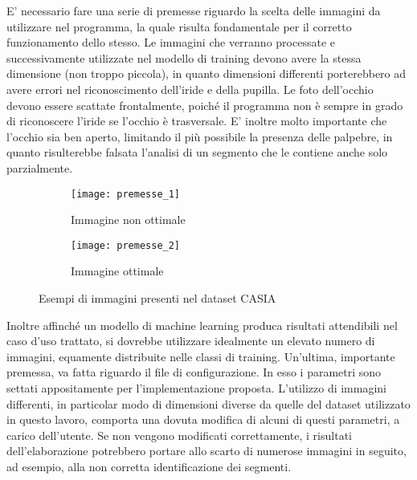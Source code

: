 E’ necessario fare una serie di premesse riguardo la scelta delle immagini da utilizzare nel programma, la quale risulta fondamentale per il corretto funzionamento dello stesso. Le immagini che verranno processate e successivamente utilizzate nel modello di training devono avere la stessa dimensione (non troppo piccola), in quanto dimensioni differenti porterebbero ad avere errori nel riconoscimento dell’iride e della pupilla. Le foto dell’occhio devono essere scattate frontalmente, poiché il programma non è sempre in grado di riconoscere l’iride se l’occhio è trasversale. E’ inoltre molto importante che l’occhio sia ben aperto, limitando il più possibile la presenza delle palpebre, in quanto risulterebbe falsata l’analisi di un segmento che le contiene anche solo parzialmente. 

\begin{figure}
  \centering
  \begin{subfigure}[b]{0.4\textwidth}
    \centering
    \texttt{[image: premesse\_1]}
    \caption{Immagine non ottimale}    
  \end{subfigure}
  \hfill
  \begin{subfigure}[b]{0.4\textwidth}
    \centering
    \texttt{[image: premesse\_2]}
    \caption{Immagine ottimale}       
  \end{subfigure}
  \caption{Esempi di immagini presenti nel dataset CASIA}
\end{figure}

Inoltre affinché un modello di machine learning produca risultati attendibili nel caso d’uso trattato, si dovrebbe utilizzare idealmente un elevato numero di immagini, equamente distribuite nelle classi di training. Un’ultima, importante premessa, va fatta riguardo il file di configurazione. In esso i parametri  sono settati appositamente per l’implementazione proposta. L’utilizzo di immagini differenti, in particolar modo di dimensioni diverse da quelle del dataset utilizzato in questo lavoro, comporta una dovuta modifica di alcuni di questi parametri, a carico dell’utente. Se non vengono modificati correttamente, i risultati dell’elaborazione potrebbero portare allo scarto di numerose immagini in seguito, ad esempio,  alla non corretta identificazione dei segmenti. 
